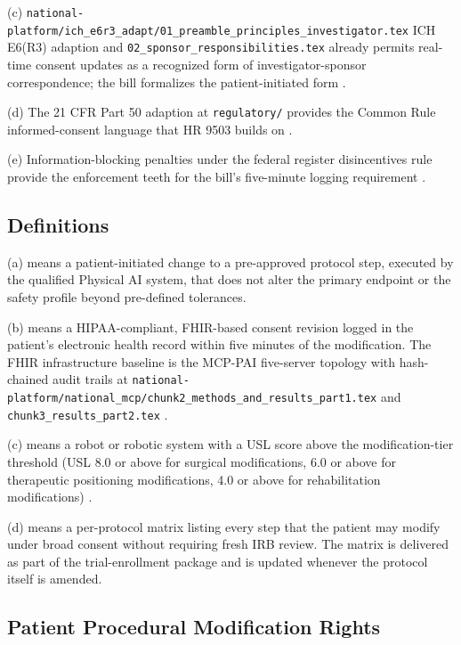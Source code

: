 (c) 
\texttt{national-platform/ich\_e6r3\_adapt/01\_preamble\_principles\_investigator.tex} ICH E6(R3) adaption and \texttt{02\_sponsor\_responsibilities.tex} already permits real-time consent updates as a recognized form of investigator-sponsor
correspondence; the bill formalizes the patient-initiated form
\cite{kawchak_2026_18973368}.

(d) The 21 CFR Part 50 adaption at
\texttt{regulatory/} provides the Common Rule informed-consent
language that HR 9503 builds on \cite{kawchak_2026_19040707}.

(e) Information-blocking penalties under the federal register
disincentives rule provide the enforcement teeth for the bill's
five-minute logging requirement
\cite{federal_register_info_blocking_disincentives_2024}.

\subsection{Definitions}

\hspace{0.5cm} (a)  means a patient-initiated
change to a pre-approved protocol step, executed by the qualified
Physical AI system, that does not alter the primary endpoint or the
safety profile beyond pre-defined tolerances.

(b)  means a HIPAA-compliant,
FHIR-based consent revision logged in the patient's electronic health
record within five minutes of the modification. The FHIR
infrastructure baseline is the MCP-PAI five-server topology with hash-chained audit trails at
\texttt{national-platform/national\_mcp/chunk2\_methods\_and\_results\_part1.tex}
and \texttt{chunk3\_results\_part2.tex} \cite{kawchak_2026_19244918}.

(c)  means a robot or
robotic system with a USL score above the modification-tier
threshold (USL 8.0 or above for surgical modifications, 6.0 or above
for therapeutic positioning modifications, 4.0 or above for
rehabilitation modifications) \cite{kawchak_2026_18778219}.

(d)  means a per-protocol matrix
listing every step that the patient may modify under broad consent
without requiring fresh IRB review. The matrix is delivered as part
of the trial-enrollment package and is updated whenever the protocol
itself is amended.

\subsection{Patient Procedural Modification Rights}

